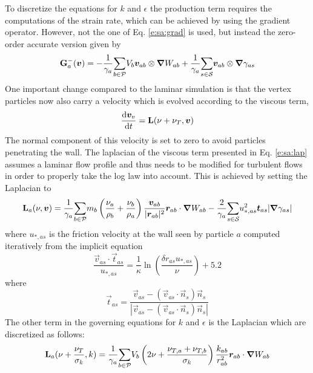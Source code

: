 \documentclass{../GPUSPHtemplate}
\begin{document}
To discretize the equations for $k$ and $\epsilon$ the production term
requires the computations of the strain rate, which can be achieved by
using the gradient operator. However, not the one of Eq.
\eqref{e:sa:grad} is used, but instead the zero-order accurate version
given by
\begin{equation}
\textbf{G}^-_a(\bm{v}) = - \frac{1}{\gamma_a}\underset{b \in \mathcal{P}}{\sum} V_b \bm{v}_{ab} \otimes \bm{\nabla} W_{ab}
 +\frac{1}{\gamma_a}\underset{s \in \mathcal{S}}{\sum} \bm{v}_{ab} \otimes \bm{\nabla} \gamma_{as}
\label{e:turb:grad-}
\end{equation}
One important change compared to the laminar simulation is that the
vertex particles now also carry a velocity which is evolved according to
the viscous term, \ie
\begin{equation}
\frac{\text{d} \bm{v}_v}{\text{d} t} = \textbf{L}(\nu + \nu_T, \bm{v})
\label{e:turb:vert-vel}
\end{equation}
The normal component of this velocity is set to zero to avoid particles
penetrating the wall. The laplacian of the viscous term presented in Eq.
\eqref{e:sa:lap} assumes a laminar flow profile and thus needs to be
modified for turbulent flows in order to properly take the log law into
account. This is achieved by setting the Laplacian to
\begin{equation}
\textbf{L}_a(\nu, \bm{v}) = \frac{1}{\gamma_a}\underset{b \in \mathcal{P}}{\sum} m_b \left(\frac{\nu_a}{\rho_b} + \frac{\nu_b}{\rho_a}\right) \frac{\bm{v}_{ab}}{|\bm{r}_{ab}|^2}\bm{r}_{ab}\cdot \bm{\nabla} W_{ab}
 - \frac{2}{\gamma_a} \underset{s \in \mathcal{S}}{\sum} u_{*,as}^2 \bm{t}_{as} |\bm{\nabla} \gamma_{as}|
\label{e:turb:lap}
\end{equation}
where $u_{*,as}$ is the friction velocity at the wall seen by particle
$a$ computed iteratively from the implicit equation
\begin{equation}
\frac{\vec{v}_{as}\cdot\vec{t}_{as}}{u_{*,as}} =
\frac{1}{\kappa}\ln\left( \frac{\delta r_{as} u_{*,as}}{\nu} \right) +
5.2
\label{e:turb:fric-vel}
\end{equation}
where
\begin{equation}
\vec{t}_{as} = \frac{\vec{v}_{as} -
(\vec{v}_{as}\cdot\vec{n}_s)\vec{n}_s}{|\vec{v}_{as} -
(\vec{v}_{as}\cdot\vec{n}_s)\vec{n}_s|}
\label{e:turb:tas}
\end{equation}
The other term in the governing equations for $k$ and $\epsilon$ is the
Laplacian which are discretized as follows:
\begin{equation}
\textbf{L}_a(\nu + \frac{\nu_T}{\sigma_k}, k) = \frac{1}{\gamma_a}\underset{b \in \mathcal{P}}{\sum} V_b
\left( 2\nu + \frac{\nu_{T,a} + \nu_{T,b}}{\sigma_k} \right)
\frac{k_{ab}}{r_{ab}^2}\bm{r}_{ab}\cdot \bm{\nabla} W_{ab}
\label{e:turb:k-lap-sa}
\end{equation}
\end{document}
